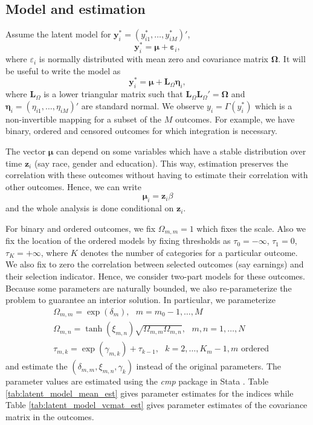 \subsection{Model and estimation}
Assume the latent model for $\mathbf{y}^*_i = (y^*_{i1},\ldots,y^*_{iM})'$,
\[
\mathbf{y}^*_i = \mathbf{\mu} + \mathbf{\varepsilon} _i, 
\]
where $\varepsilon_i$ is normally distributed with mean zero and covariance matrix $\mathbf{\Omega}$. 
It will be useful to write the model as 
\[
\mathbf{y}^*_i = \mathbf{\mu} + \mathbf{L}_\Omega \mathbf{\eta}_i,
\]
where $\mathbf{L}_\Omega$ is a lower triangular matrix such that 
$\mathbf{L}_\Omega \mathbf{L}_\Omega' = \mathbf{\Omega}$ and $\mathbf{\eta}_i = (\eta_{i1},\ldots,\eta_{iM})'$ 
are standard normal. We observe $y_i = \Gamma(y^*_i)$ which is a non-invertible mapping for a subset 
of the $M$ outcomes. For example, we have binary, ordered and censored outcomes for which integration 
is necessary.

The vector $\mathbf{\mu}$ can depend on some variables which have a stable distribution over time $\mathbf{z}_i$ 
(say race, gender and education). This way, estimation preserves the correlation with these outcomes 
without having to estimate their correlation with other outcomes. Hence, we can write 
\[
\mathbf{\mu}_i = \mathbf{z}_i \beta
\]
and the whole analysis is done conditional on $\mathbf{z}_i$.

For binary and ordered outcomes, we fix $\Omega_{m,m}=1$ which fixes the scale. Also we fix the 
location of the ordered models by fixing thresholds as $\tau_0 = -\infty$, $\tau_1 = 0$, $\tau_K = +\infty$, 
where $K$ denotes the number of categories for a particular outcome. 
We also fix to zero the correlation between selected outcomes (say earnings) and 
their selection indicator. Hence, we consider two-part models for these outcomes. Because some parameters are 
naturally bounded, we also re-parameterize the problem to guarantee an interior solution. In particular, we parameterize 
\begin{align*}
&\Omega_{m,m} = \exp(\delta_m), \mbox{   } m=m_0-1,\ldots,M \\
&\Omega_{m,n} = \tanh(\xi_{m,n})\sqrt{\Omega_{m,m}\Omega_{m,n}}, \mbox{   } m,n=1,\ldots,N \\
&\tau_{m,k} = \exp(\gamma_{m,k}) + \tau_{k-1}, \mbox{   } k=2,\ldots,K_m-1, m \mbox{ ordered}
\end{align*}
and estimate the $(\delta_{m,m}, \xi_{m,n}, \gamma_k)$ instead of the original parameters. 
The parameter values are estimated using the \emph{cmp} package in Stata \citep{statacmp2011}.
Table \ref{tab:latent_model_mean_est} gives parameter estimates for the indices while Table \ref{tab:latent_model_vcmat_est} 
gives parameter estimates of the covariance matrix in the outcomes.



